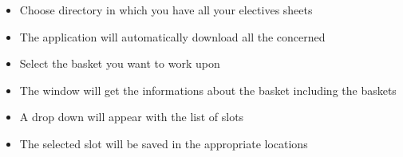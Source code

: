 \documentclass[letterpaper,10pt,english]{sphinxmanual}
\begin{document}
\begin{itemize}
\item {} 
Choose directory in which you have all your electives sheets

\end{itemize}

\begin{itemize}
\item {} 
The application will automatically download all the concerned

\end{itemize}

\begin{itemize}
\item {} 
Select the basket you want to work upon

\end{itemize}

\begin{itemize}
\item {} 
The window will get the informations about the basket including the baskets

\end{itemize}

\begin{itemize}
\item {} 
A drop down will appear with the list of slots

\end{itemize}

\begin{itemize}
\item {} 
The selected slot will be saved in the appropriate locations

\end{itemize}
\end{document}
